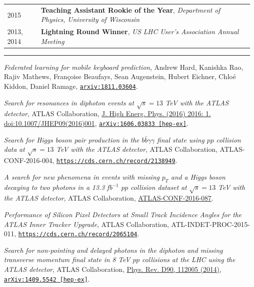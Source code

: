 \documentclass{letter}
\begin{document}
\begin{tabular}{p{}p{}}
  2015
  &
  \textbf{Teaching Assistant Rookie of the Year}, \textit{Department of Physics, University of Wisconsin} 
  \\
  2013, 2014
  & 
  \textbf{Lightning Round Winner}, \textit{US LHC User's Association Annual Meeting}
  \\
\end{tabular}



\begin{flushleft}
  \Large{\textsc{\textbf{\color{Maroon}{Selected Publications}}}}
  \vspace{1pt}  %
  \hrule
\end{flushleft}

\textit{Federated learning for mobile keyboard prediction}, Andrew Hard, Kanishka Rao, Rajiv Mathews, Fran{\c c}oise Beaufays, Sean Augenstein, Hubert Eichner, Chlo{\'e} Kiddon, Daniel Ramage, \href{https://arxiv.org/abs/1811.03604}{\texttt{arxiv:1811.03604}}.

\textit{Search for resonances in diphoton events at $\sqrt{s}=13$ TeV with the ATLAS detector}, ATLAS Collaboration, \href{http://link.springer.com/article/10.1007/JHEP09(2016)001}{J. High Energ. Phys. (2016) 2016: 1. doi:10.1007/JHEP09(2016)001}, \href{http://arxiv.org/abs/1606.03833}{\texttt{arXiv:1606.03833 [hep-ex]}}.

\textit{Search for Higgs boson pair production in the $b \bar{b} \gamma \gamma$ final state using $pp$ collision data at $\sqrt{s}=13$ TeV with the ATLAS detector}, ATLAS Collaboration, ATLAS-CONF-2016-004, \href{https://cds.cern.ch/record/2138949}{\texttt{https://cds.cern.ch/record/2138949}}.

\textit{A search for new phenomena in events with missing $p_{T}$ and a Higgs boson decaying to two photons in a 13.3 fb$^{-1}$ $pp$ collision dataset at $\sqrt{s}=13$ TeV with the ATLAS detector}, ATLAS Collaboration, \href{https://cds.cern.ch/record/2206281}{ATLAS-CONF-2016-087}.

\textit{Performance of Silicon Pixel Detectors at Small Track Incidence Angles for the ATLAS Inner Tracker Upgrade}, ATLAS Collaboration, ATL-INDET-PROC-2015-011, \href{https://cds.cern.ch/record/2065104}{\texttt{https://cds.cern.ch/record/2065104}}.

\textit{Search for non-pointing and delayed photons in the diphoton and missing transverse momentum final state in 8 TeV $pp$ collisions at the LHC using the ATLAS detector}, ATLAS Collaboration, 
\href{http://journals.aps.org/prd/abstract/10.1103/PhysRevD.90.112005}{Phys. Rev. D90, 112005 (2014)}, \href{https://arxiv.org/abs/1409.5542}{\texttt{arXiv:1409.5542 [hep-ex]}}.
\end{document}

